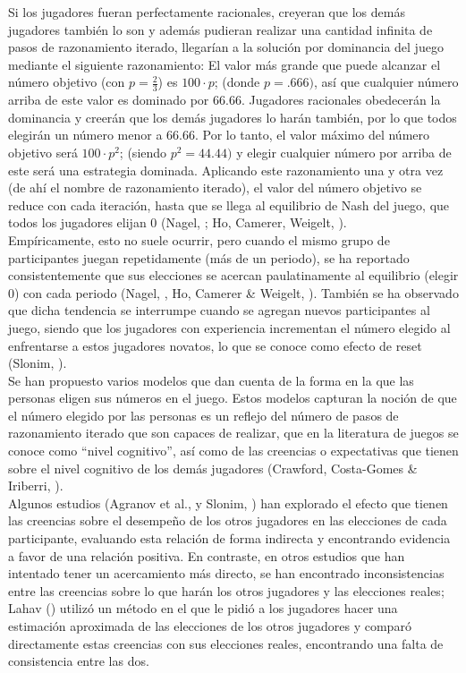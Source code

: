 Si los jugadores fueran perfectamente racionales, creyeran que los demás jugadores también lo son y además pudieran realizar una cantidad infinita de pasos de razonamiento iterado, llegarían a la solución por dominancia del juego mediante el siguiente razonamiento: El valor más grande que puede alcanzar el número objetivo (con $p = \frac{2}{3}$) es $100 \cdot p$; (donde $p=.666)$, así que cualquier número arriba de este valor es dominado por $66.66$. Jugadores racionales obedecerán la dominancia y creerán que los demás jugadores lo harán también, por lo que todos elegirán un número menor a $66.66$. Por lo tanto, el valor máximo del número objetivo será $100 \cdot p^2$; (siendo $p^2=44.44)$ y elegir cualquier número por arriba de este será una estrategia dominada. Aplicando este razonamiento una y otra vez (de ahí el nombre de razonamiento iterado), el valor del número objetivo se reduce con cada iteración, hasta que se llega al equilibrio de Nash del juego, que todos los jugadores elijan $0$ (Nagel, \citeyear{Nagel}; Ho, Camerer, Weigelt, \citeyear{Ho}).\\

Empíricamente, esto no suele ocurrir, pero cuando el mismo grupo de participantes juegan repetidamente (más de un periodo), se ha reportado consistentemente que sus elecciones se acercan paulatinamente al equilibrio (elegir $0$) con cada periodo (Nagel, \citeyear{Nagel}, Ho, Camerer & Weigelt, \citeyear{Ho}). También se ha observado que dicha tendencia se interrumpe cuando se agregan nuevos participantes al juego, siendo que los jugadores con experiencia incrementan el número elegido al enfrentarse a estos jugadores novatos, lo que se conoce como efecto de reset (Slonim, \citeyear{Slonim}).\\

Se han propuesto varios modelos que dan cuenta de la forma en la que las personas eligen sus números en el juego. Estos modelos capturan la noción de que el número elegido por las personas es un reflejo del número de pasos de razonamiento iterado que son capaces de realizar, que en la literatura de juegos se conoce como “nivel cognitivo”, así como de las creencias o expectativas que tienen sobre el nivel cognitivo de los demás jugadores (Crawford, Costa-Gomes & Iriberri, \citeyear{Crawford}).\\

Algunos estudios (Agranov et al., \citeyear{Agranov} y Slonim, \citeyear{Slonim})  han explorado el efecto que tienen las creencias sobre el desempeño de los otros jugadores en las elecciones de cada participante, evaluando esta relación de forma indirecta y encontrando evidencia a favor de una relación positiva. En contraste, en otros estudios que han intentado tener un acercamiento más directo, se han encontrado inconsistencias entre las creencias sobre lo que harán los otros jugadores y las elecciones reales; Lahav (\citeyear{Lahav}) utilizó un método en el que le pidió a los jugadores hacer una estimación aproximada de las elecciones de los otros jugadores y comparó directamente estas creencias con sus elecciones reales, encontrando una falta de consistencia entre las dos.\\

